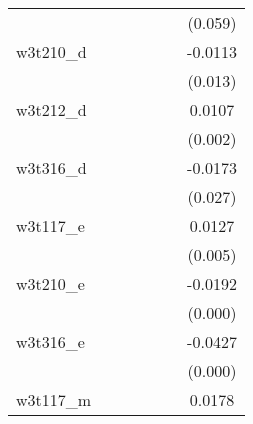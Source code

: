 {\begin{tabular}{l*{6}{c}}
            &                     &                     &                     &                     &                     &     (0.059)         \\
[1em]
w3t210\_d    &                     &                     &                     &                     &                     &     -0.0113\sym{**} \\
            &                     &                     &                     &                     &                     &     (0.013)         \\
[1em]
w3t212\_d    &                     &                     &                     &                     &                     &      0.0107\sym{***}\\
            &                     &                     &                     &                     &                     &     (0.002)         \\
[1em]
w3t316\_d    &                     &                     &                     &                     &                     &     -0.0173\sym{**} \\
            &                     &                     &                     &                     &                     &     (0.027)         \\
[1em]
w3t117\_e    &                     &                     &                     &                     &                     &      0.0127\sym{***}\\
            &                     &                     &                     &                     &                     &     (0.005)         \\
[1em]
w3t210\_e    &                     &                     &                     &                     &                     &     -0.0192\sym{***}\\
            &                     &                     &                     &                     &                     &     (0.000)         \\
[1em]
w3t316\_e    &                     &                     &                     &                     &                     &     -0.0427\sym{***}\\
            &                     &                     &                     &                     &                     &     (0.000)         \\
[1em]
w3t117\_m    &                     &                     &                     &                     &                     &      0.0178\sym{***}\\

\end{tabular}}
